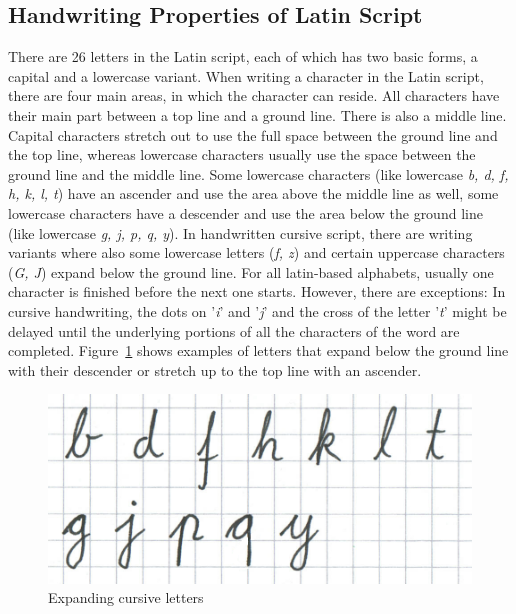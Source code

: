 \subsection{Handwriting Properties of Latin Script}
\label{sec:handwritingpropertieslatin}

There are 26 letters in the Latin script, each of which has two basic forms, 
a capital and a lowercase variant. When writing a character 
in the Latin script, there are four main areas, in which the character 
can reside. All characters have their main part between a top line and a 
ground line. There is also a middle line. Capital characters stretch out to use
the full space between the ground line and the top line, whereas lowercase 
characters usually use the space between the ground line and the middle line. 
Some lowercase characters (like lowercase \emph{b, d, f, h, k, l, t}) have an
ascender and use the area above the middle line as well, 
some lowercase characters have a descender and use the area below the ground 
line (like lowercase \emph{g, j, p, q, y}). In handwritten cursive script, 
there are writing variants where also some lowercase letters (\emph{f, z}) and
certain uppercase characters (\emph{G, J}) expand below the ground line.
For all latin-based alphabets, usually one character is finished before the 
next one starts. However, there are exceptions:
In cursive handwriting, the dots on '\emph{i}' and '\emph{j}' and the cross
of the letter '\emph{t}' might be delayed until the underlying portions of all 
the characters of the word are completed. 
Figure~\ref{fig:expandingcursiveletters} shows examples of letters that expand 
below the ground line with their descender or stretch up to the top line with
an ascender.


\begin{figure}[htbp]
\begin{center}
\includegraphics[scale=0.3]{images/expandingcursiveletters.png}
\caption{Expanding cursive letters}
\label{fig:expandingcursiveletters}
\end{center}
\end{figure}

